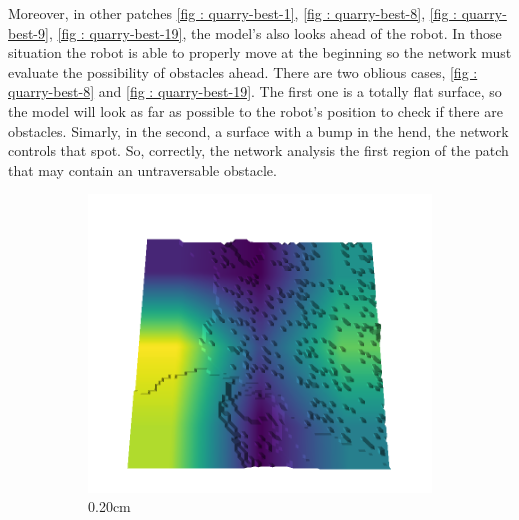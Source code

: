 \documentclass[../document.tex]{subfiles}
\begin{document}
Moreover, in other patches \ref{fig : quarry-best-1},  \ref{fig : quarry-best-8},  \ref{fig : quarry-best-9},  \ref{fig : quarry-best-19}, the model's also looks ahead of the robot. In those situation the robot is able to properly move at the beginning so the network must evaluate the possibility of obstacles ahead. There are two oblious cases, \ref{fig : quarry-best-8} and  \ref{fig : quarry-best-19}. The first one is a totally flat surface, so the model will look as far as possible to the robot's position to check if there are obstacles. Simarly, in the second, a surface with a bump in the hend, the network controls that spot. So, correctly, the network analysis the first region of the patch that may contain an untraversable obstacle.
\begin{figure}[H]
    \centering
    \begin{subfigure}[b]{0.192\linewidth}
    \includegraphics[width=\linewidth]{../img/5/quarry/best/20-patch-3d-majavi-colormap-0.png}
    \caption{0.20cm}
    \label{fig : quarry-best-0}
    \end{subfigure}
    \begin{subfigure}[b]{0.192\linewidth}

\end{subfigure}
\end{figure}
\end{document}
